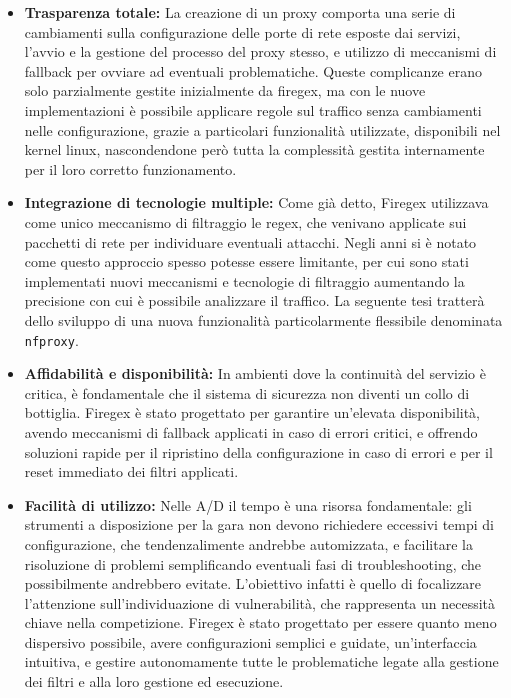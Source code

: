 \begin{itemize}
    \item \textbf{Trasparenza totale:} La creazione di un proxy comporta una serie di cambiamenti sulla configurazione delle porte di rete esposte dai servizi, l'avvio e la gestione del processo del proxy stesso,
    e utilizzo di meccanismi di fallback per ovviare ad eventuali problematiche. Queste complicanze erano solo parzialmente gestite inizialmente da firegex, ma con le nuove implementazioni
    è possibile applicare regole sul traffico senza cambiamenti nelle configurazione, grazie a particolari funzionalità utilizzate, disponibili nel kernel linux, nascondendone però
    tutta la complessità gestita internamente per il loro corretto funzionamento.
    \item \textbf{Integrazione di tecnologie multiple:} Come già detto, Firegex utilizzava come unico meccanismo di filtraggio le regex, che venivano
    applicate sui pacchetti di rete per individuare eventuali attacchi. Negli anni si è notato come questo approccio spesso potesse essere limitante, per cui sono stati
    implementati nuovi meccanismi e tecnologie di filtraggio aumentando la precisione con cui è possibile analizzare il traffico. La seguente tesi tratterà dello sviluppo
    di una nuova funzionalità particolarmente flessibile denominata \texttt{nfproxy}.
    \item \textbf{Affidabilità e disponibilità:} In ambienti dove la continuità del servizio è critica, è fondamentale che il sistema di sicurezza non diventi un
    collo di bottiglia. Firegex è stato progettato per garantire un’elevata disponibilità, avendo meccanismi di fallback applicati in caso di errori critici,
    e offrendo soluzioni rapide per il ripristino della configurazione in caso di errori e per il reset immediato dei filtri applicati.
    \item \textbf{Facilità di utilizzo:} Nelle A/D il tempo è una risorsa fondamentale: gli strumenti a disposizione per la gara non devono
    richiedere eccessivi tempi di configurazione, che tendenzalimente andrebbe automizzata, e facilitare la risoluzione di problemi
    semplificando eventuali fasi di troubleshooting, che possibilmente andrebbero evitate. L'obiettivo infatti è quello di focalizzare l'attenzione sull'individuazione di vulnerabilità,
    che rappresenta un necessità chiave nella competizione. Firegex è stato progettato per essere quanto meno dispersivo possibile,
    avere configurazioni semplici e guidate, un'interfaccia intuitiva, e gestire autonomamente tutte le problematiche legate alla gestione dei filtri e
    alla loro gestione ed esecuzione.
\end{itemize}

